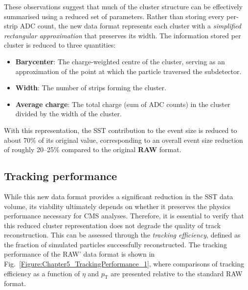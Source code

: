 These observations suggest that much of the cluster structure can be effectively summarised using a reduced set of parameters. Rather than storing every per-strip ADC count, the new data format represents each cluster with a \textit{simplified rectangular approximation} that preserves its width. The information stored per cluster is reduced to three quantities:

\begin{itemize}
    \item \textbf{Barycenter}: The charge-weighted centre of the cluster, serving as an approximation of the point at which the particle traversed the subdetector.
    \item \textbf{Width}: The number of strips forming the cluster.
    \item \textbf{Average charge}: The total charge (sum of ADC counts) in the cluster divided by the width of the cluster.
\end{itemize}

With this representation, the \ac{SST} contribution to the event size is reduced to about 70\% of its original value, corresponding to an overall event size reduction of roughly 20–25\% compared to the original \textbf{RAW} format.

\subsection{Tracking performance}

While this new data format provides a significant reduction in the \ac{SST} data volume, its viability ultimately depends on whether it preserves the physics performance necessary for \ac{CMS} analyses. Therefore, it is essential to verify that this reduced cluster representation does not degrade the quality of track reconstruction. This can be assessed through the \textit{tracking efficiency}, defined as the fraction of simulated particles successfully reconstructed. The tracking performance of the RAW' data format is shown in Fig.~\ref{Figure:Chapter5_TrackingPerformance_1}, where comparisons of tracking efficiency as a function of $\eta$ and $p_\mathrm{T}$ are presented relative to the standard RAW format.

